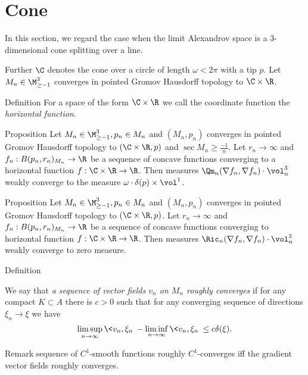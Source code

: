 
\section{Cone}

In this section, we regard the case when the limit Alexandrov space
is a 3-dimensional cone splitting over a line.

Further $\C$ denotes the cone over a circle of length  $\omega<2\pi$
with a tip $p$.
Let $M_n\in\M_{\ge -1}^3$ converges in pointed
Gromov Hausdorff topology to $\C\times\R$.

\begin{thm}{Definition}
For a space of the form $\C\times\R$
we call the
coordinate function   
the \emph{horizontal function}. 
\end{thm}

\begin{thm}{Proposition}
Let $M_n\in\M_{\ge -1}^3, p_n\in M_n$ and $(M_n,p_n)$ converges in pointed
Gromov Hausdorff topology to $(\C\times\R, p)$
and $\operatorname{sec}M_n\ge\frac{-1}{n}$.
Let $r_n\to\infty$ and $f_n:B(p_n,r_n)_{M_n}\to \R$ be a sequence of concave
functions 
converging to a horizontal function $f:\C\times\R\to\R$.
Then measures $\Qm_n(\nabla f_n, \nabla f_n)\cdot\vol^3_n$
weakly converge to the measure $\omega\cdot\delta(p)\times \vol^1$.

\end{thm}

\begin{thm}{Proposition}
Let $M_n\in\M_{\ge -1}^3, p_n\in M_n$ and $(M_n,p_n)$ converges in pointed
Gromov Hausdorff topology to $(\C\times\R, p)$.
Let $r_n\to\infty$ and $f_n:B(p_n,r_n)_{M_n}\to \R$ be a sequence of concave
functions 
converging to horizontal function $f:\C\times\R\to\R$.
Then measures $\Ric_n(\nabla f_n, \nabla f_n)\cdot\vol^3_n$
weakly converge to zero measure.

\end{thm}



\begin{thm}{Definition}

We say that \emph {a sequence of vector fields $v_n$ on $M_n$ roughly converges }
if for any compact $K\subset A$ there is $c>0$ such that
for any converging sequence of directions $\xi_n\to\xi$
we have
$$\limsup_{n\to\infty} \<v_n,\xi_n\>-
 \liminf_{n\to\infty} \<v_n,\xi_n\>\le
 c\delta(\xi).
 $$
\end{thm}

\begin{thm}{Remark}
sequence of $C^1$-smooth functions roughly $C^1$-converges
iff the gradient vector fields
roughly converges.

\end{thm}



